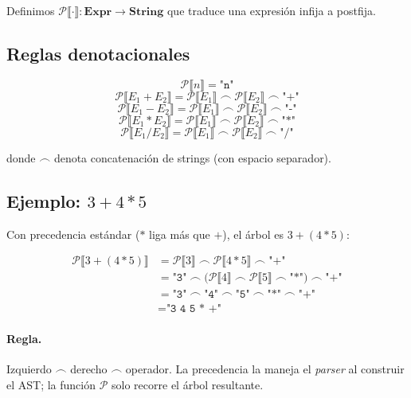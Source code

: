 \documentclass[11pt]{article}
\begin{document}
Definimos $\mathcal{P}\llbracket \cdot \rrbracket : \mathbf{Expr}
\to \mathbf{String}$ que traduce una expresión infija a postfija.

\subsection*{Reglas denotacionales}

\[
  \mathcal{P}\llbracket n \rrbracket = \texttt{"n"}
\]
\[
  \mathcal{P}\llbracket E_1 + E_2 \rrbracket
    = \mathcal{P}\llbracket E_1 \rrbracket
      \;\frown\; \mathcal{P}\llbracket E_2 \rrbracket
      \;\frown\; \texttt{"+"}
\]
\[
  \mathcal{P}\llbracket E_1 - E_2 \rrbracket
    = \mathcal{P}\llbracket E_1 \rrbracket
      \;\frown\; \mathcal{P}\llbracket E_2 \rrbracket
      \;\frown\; \texttt{"-"}
\]
\[
  \mathcal{P}\llbracket E_1 * E_2 \rrbracket
    = \mathcal{P}\llbracket E_1 \rrbracket
      \;\frown\; \mathcal{P}\llbracket E_2 \rrbracket
      \;\frown\; \texttt{"*"}
\]
\[
  \mathcal{P}\llbracket E_1 / E_2 \rrbracket
    = \mathcal{P}\llbracket E_1 \rrbracket
      \;\frown\; \mathcal{P}\llbracket E_2 \rrbracket
      \;\frown\; \texttt{"/"}
\]

donde $\frown$ denota concatenación de strings (con espacio separador).

\subsection*{Ejemplo: $3 + 4 * 5$}

Con precedencia estándar ($*$ liga más que $+$), el árbol es
$3 + (4 * 5)$:

\begin{align*}
  \mathcal{P}\llbracket 3 + (4 * 5) \rrbracket
    &= \mathcal{P}\llbracket 3 \rrbracket
       \;\frown\; \mathcal{P}\llbracket 4 * 5 \rrbracket
       \;\frown\; \texttt{"+"} \\
    &= \texttt{"3"}
       \;\frown\;
       \bigl(\mathcal{P}\llbracket 4 \rrbracket
             \;\frown\; \mathcal{P}\llbracket 5 \rrbracket
             \;\frown\; \texttt{"*"}\bigr)
       \;\frown\; \texttt{"+"} \\
    &= \texttt{"3"} \;\frown\; \texttt{"4"} \;\frown\;
       \texttt{"5"} \;\frown\; \texttt{"*"} \;\frown\; \texttt{"+"} \\
    &= \texttt{"3 4 5 * +"}
\end{align*}

\paragraph{Regla.} Izquierdo $\frown$ derecho $\frown$ operador.
  La precedencia la maneja el \emph{parser} al construir el AST;
  la función $\mathcal{P}$ solo recorre el árbol resultante.
\end{document}
